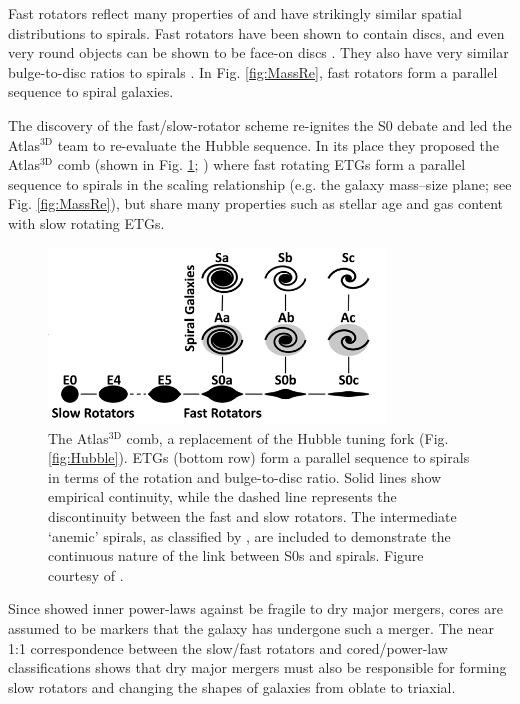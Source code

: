 	Fast rotators reflect many properties of and have strikingly similar spatial distributions to spirals. Fast rotators have been shown to contain discs, and even very round objects can be shown to be face-on discs \citep[e.g.][]{Cappellari2013a, Weijmans2014}. They also have very similar bulge-to-disc ratios to spirals \citep{Krajnovic2013}. In Fig. \ref{fig:MassRe}, fast rotators form a parallel sequence to spiral galaxies.

	The discovery of the fast/slow-rotator scheme re-ignites the S0 debate and led the Atlas$^\text{3D}$ team to re-evaluate the Hubble sequence. In its place they proposed the Atlas$^\text{3D}$ comb (shown in Fig. \ref{fig:Atlas3Dcomb}; \citealt{Cappellari2011a}) where fast rotating ETGs form a parallel sequence to spirals in the scaling relationship (e.g. the galaxy mass--size plane; see Fig. \ref{fig:MassRe}), but share many properties such as stellar age and gas content with slow rotating ETGs. 

	\begin{figure}
		\centering
		\includegraphics[width=0.8\textwidth]{introduction/Atlas3D_comb.png}
		\caption[The Atlas$^\text{3D}$ comb]{The Atlas$^\text{3D}$ comb, a replacement of the Hubble tuning fork (Fig. \ref{fig:Hubble}). ETGs (bottom row) form a parallel sequence to spirals in terms of the rotation and bulge-to-disc ratio. Solid lines show empirical continuity, while the dashed line represents the discontinuity between the fast and slow rotators. The intermediate `anemic' spirals, as classified by \citet{VandenBergh1976}, are included to demonstrate the continuous nature of the link between S0s and spirals. Figure courtesy of \citet{Cappellari2011a}.}
		\label{fig:Atlas3Dcomb}
	\end{figure}

	Since \citet{Sarzi2015} showed inner power-laws against be fragile to dry major mergers, cores are assumed to be markers that the galaxy has undergone such a merger. The near 1:1 correspondence between the slow/fast rotators and cored/power-law classifications shows that dry major mergers must also be responsible for forming slow rotators and changing the shapes of galaxies from oblate to triaxial.

